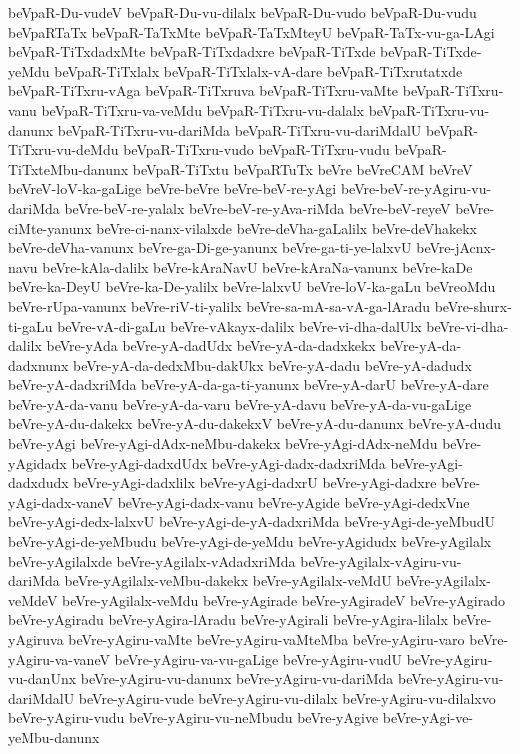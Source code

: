 {beVpaR-Du-vudeV
beVpaR-Du-vu-dilalx
beVpaR-Du-vudo
beVpaR-Du-vudu
beVpaRTaTx
beVpaR-TaTxMte
beVpaR-TaTxMteyU
beVpaR-TaTx-vu-ga-LAgi
beVpaR-TiTxdadxMte
beVpaR-TiTxdadxre
beVpaR-TiTxde
beVpaR-TiTxde-yeMdu
beVpaR-TiTxlalx
beVpaR-TiTxlalx-vA-dare
beVpaR-TiTxrutatxde
beVpaR-TiTxru-vAga
beVpaR-TiTxruva
beVpaR-TiTxru-vaMte
beVpaR-TiTxru-vanu
beVpaR-TiTxru-va-veMdu
beVpaR-TiTxru-vu-dalalx
beVpaR-TiTxru-vu-danunx
beVpaR-TiTxru-vu-dariMda
beVpaR-TiTxru-vu-dariMdalU
beVpaR-TiTxru-vu-deMdu
beVpaR-TiTxru-vudo
beVpaR-TiTxru-vudu
beVpaR-TiTxteMbu-danunx
beVpaR-TiTxtu
beVpaRTuTx
beVre
beVreCAM
beVreV
beVreV-loV-ka-gaLige
beVre-beVre
beVre-beV-re-yAgi
beVre-beV-re-yAgiru-vu-dariMda
beVre-beV-re-yalalx
beVre-beV-re-yAva-riMda
beVre-beV-reyeV
beVre-ciMte-yanunx
beVre-ci-nanx-vilalxde
beVre-deVha-gaLalilx
beVre-deVhakekx
beVre-deVha-vanunx
beVre-ga-Di-ge-yanunx
beVre-ga-ti-ye-lalxvU
beVre-jAcnx-navu
beVre-kAla-dalilx
beVre-kAraNavU
beVre-kAraNa-vanunx
beVre-kaDe
beVre-ka-DeyU
beVre-ka-De-yalilx
beVre-lalxvU
beVre-loV-ka-gaLu
beVreoMdu
beVre-rUpa-vanunx
beVre-riV-ti-yalilx
beVre-sa-mA-sa-vA-ga-lAradu
beVre-shurx-ti-gaLu
beVre-vA-di-gaLu
beVre-vAkayx-dalilx
beVre-vi-dha-dalUlx
beVre-vi-dha-dalilx
beVre-yAda
beVre-yA-dadUdx
beVre-yA-da-dadxkekx
beVre-yA-da-dadxnunx
beVre-yA-da-dedxMbu-dakUkx
beVre-yA-dadu
beVre-yA-dadudx
beVre-yA-dadxriMda
beVre-yA-da-ga-ti-yanunx
beVre-yA-darU
beVre-yA-dare
beVre-yA-da-vanu
beVre-yA-da-varu
beVre-yA-davu
beVre-yA-da-vu-gaLige
beVre-yA-du-dakekx
beVre-yA-du-dakekxV
beVre-yA-du-danunx
beVre-yA-dudu
beVre-yAgi
beVre-yAgi-dAdx-neMbu-dakekx
beVre-yAgi-dAdx-neMdu
beVre-yAgidadx
beVre-yAgi-dadxdUdx
beVre-yAgi-dadx-dadxriMda
beVre-yAgi-dadxdudx
beVre-yAgi-dadxlilx
beVre-yAgi-dadxrU
beVre-yAgi-dadxre
beVre-yAgi-dadx-vaneV
beVre-yAgi-dadx-vanu
beVre-yAgide
beVre-yAgi-dedxVne
beVre-yAgi-dedx-lalxvU
beVre-yAgi-de-yA-dadxriMda
beVre-yAgi-de-yeMbudU
beVre-yAgi-de-yeMbudu
beVre-yAgi-de-yeMdu
beVre-yAgidudx
beVre-yAgilalx
beVre-yAgilalxde
beVre-yAgilalx-vAdadxriMda
beVre-yAgilalx-vAgiru-vu-dariMda
beVre-yAgilalx-veMbu-dakekx
beVre-yAgilalx-veMdU
beVre-yAgilalx-veMdeV
beVre-yAgilalx-veMdu
beVre-yAgirade
beVre-yAgiradeV
beVre-yAgirado
beVre-yAgiradu
beVre-yAgira-lAradu
beVre-yAgirali
beVre-yAgira-lilalx
beVre-yAgiruva
beVre-yAgiru-vaMte
beVre-yAgiru-vaMteMba
beVre-yAgiru-varo
beVre-yAgiru-va-vaneV
beVre-yAgiru-va-vu-gaLige
beVre-yAgiru-vudU
beVre-yAgiru-vu-danUnx
beVre-yAgiru-vu-danunx
beVre-yAgiru-vu-dariMda
beVre-yAgiru-vu-dariMdalU
beVre-yAgiru-vude
beVre-yAgiru-vu-dilalx
beVre-yAgiru-vu-dilalxvo
beVre-yAgiru-vudu
beVre-yAgiru-vu-neMbudu
beVre-yAgive
beVre-yAgi-ve-yeMbu-danunx
}
